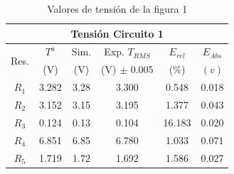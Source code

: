 \documentclass[twocolumn,11pts]{IEEEtran}
\begin{document}
\begin{table}[H]
        \caption{Valores de tensión de la figura 1 }
        \label{Tabla 1}
        \begin{center}
        \begin{tabular}{|c||c||c||c||c||c|}
        \hline
        \multicolumn{6}{|c|}{Tensión Circuito 1}\\ \hline
        \multirow{ 2}{*}{Res.}& $T^a$	&Sim. & Exp. \tiny{$T_{RMS}$} & $E_{rel}$&$E_{Abs}$\\
         &  \tiny{(V)} &  \tiny{(V)} & \tiny{(V) $\pm$ 0.005} & \tiny{(\%)} & \tiny{$(v)$} \\ \hline
        \tiny{$R_1$} &3.282 & 3.28 &3.300 &0.548 & 0.018 \\  \hline
        \tiny{$R_2$} &3.152 & 3.15 &3.195 &1.377 & 0.043 \\  \hline
        \tiny{$R_3$} &0.124& 0.13 &0.104  &16.183 & 0.020 \\  \hline
        \tiny{$R_4$} &6.851 & 6.85 &6.780  &1.033 & 0.071 \\  \hline
        \tiny{$R_5$} &1.719 &1.72 &1.692  &1.586 &0.027 \\  \hline
        \end{tabular}
        \end{center}
    \end{table}
    \vspace{0.2 cm}
\end{document}
